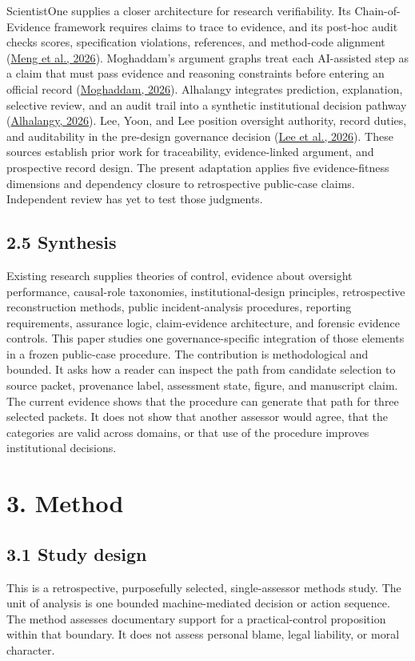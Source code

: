 \documentclass[11pt]{article}
\begin{document}
ScientistOne supplies a closer architecture for research verifiability. Its Chain-of-Evidence framework requires claims to trace to evidence, and its post-hoc audit checks scores, specification violations, references, and method-code alignment (\href{https://doi.org/10.48550/arXiv.2605.26340}{Meng et al., 2026}). Moghaddam's argument graphs treat each AI-assisted step as a claim that must pass evidence and reasoning constraints before entering an official record (\href{https://doi.org/10.48550/arXiv.2604.04103}{Moghaddam, 2026}). Alhalangy integrates prediction, explanation, selective review, and an audit trail into a synthetic institutional decision pathway (\href{https://doi.org/10.3390/info17070694}{Alhalangy, 2026}). Lee, Yoon, and Lee position oversight authority, record duties, and auditability in the pre-design governance decision (\href{https://doi.org/10.3390/systems14070849}{Lee et al., 2026}). These sources establish prior work for traceability, evidence-linked argument, and prospective record design. The present adaptation applies five evidence-fitness dimensions and dependency closure to retrospective public-case claims. Independent review has yet to test those judgments.
\subsection*{2.5 Synthesis}
Existing research supplies theories of control, evidence about oversight performance, causal-role taxonomies, institutional-design principles, retrospective reconstruction methods, public incident-analysis procedures, reporting requirements, assurance logic, claim-evidence architecture, and forensic evidence controls. This paper studies one governance-specific integration of those elements in a frozen public-case procedure.
The contribution is methodological and bounded. It asks how a reader can inspect the path from candidate selection to source packet, provenance label, assessment state, figure, and manuscript claim. The current evidence shows that the procedure can generate that path for three selected packets. It does not show that another assessor would agree, that the categories are valid across domains, or that use of the procedure improves institutional decisions.
\FloatBarrier
\section*{3. Method}
\subsection*{3.1 Study design}
This is a retrospective, purposefully selected, single-assessor methods study. The unit of analysis is one bounded machine-mediated decision or action sequence. The method assesses documentary support for a practical-control proposition within that boundary. It does not assess personal blame, legal liability, or moral character.
\end{document}
